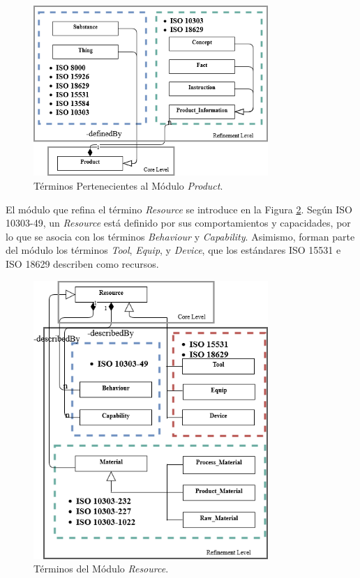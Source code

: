 \documentclass[journal]{IEEEtran}
\begin{document}
\begin{figure}[!t]
\centering
\includegraphics[width=3.5in]{figures/Completo-Product.png}
\caption{T\'erminos Pertenecientes al M\'odulo \emph{Product}.}
\label{fig5}
\end{figure}

El m\'odulo que refina el t\'ermino \emph{Resource} se introduce en la Figura \ref{fig6}. Seg\'un ISO 10303-49, un \emph{Resource} est\'a definido por sus comportamientos y capacidades, por lo que se asocia con los t\'erminos \emph{Behaviour} y \emph{Capability}. Asimismo, forman parte del m\'odulo los t\'erminos \emph{Tool}, \emph{Equip}, y \emph{Device}, que los est\'andares ISO 15531 e ISO 18629 describen como recursos. 

\begin{figure}[!t]
\centering
\includegraphics[width=3.5in]{figures/Completo-Resource.png}
\caption{T\'erminos del M\'odulo \emph{Resource}.}
\label{fig6}
\end{figure}
\end{document}
